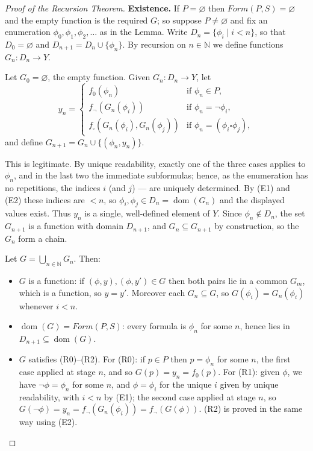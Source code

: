 \documentclass{article}
\theoremstyle{remark}\newtheorem{remark}{Remark}
\begin{document}
\begin{proof}[Proof of the Recursion Theorem]
\textbf{Existence.} If $P = \varnothing$ then $Form(P, S) = \varnothing$ and the empty function is the required $G$; so suppose $P \neq \varnothing$ and fix an enumeration $\phi_0, \phi_1, \phi_2, \dots$ as in the Lemma. Write $D_n = \{\phi_i \mid i < n\}$, so that $D_0 = \varnothing$ and $D_{n+1} = D_n \cup \{\phi_n\}$. By recursion on $n \in \mathbb{N}$ we define functions $G_n \colon D_n \to Y$.

Let $G_0 = \varnothing$, the empty function. Given $G_n \colon D_n \to Y$, let
\[
y_n =
\begin{cases}
    f_0(\phi_n) & \text{if } \phi_n \in P,\\
    f_{\neg}(G_n(\phi_i)) & \text{if } \phi_n = \neg\phi_i,\\
    f_{\square}(G_n(\phi_i), G_n(\phi_j)) & \text{if } \phi_n = (\phi_i \square \phi_j),
\end{cases}
\]
and define $G_{n+1} = G_n \cup \{(\phi_n, y_n)\}$.

This is legitimate. By unique readability, exactly one of the three cases applies to $\phi_n$, and in the last two the immediate subformulas; hence, as the enumeration has no repetitions, the indices $i$ (and $j$) --- are uniquely determined. By (E1) and (E2) these indices are $< n$, so $\phi_i, \phi_j \in D_n = \operatorname{dom}(G_n)$ and the displayed values exist. Thus $y_n$ is a single, well-defined element of $Y$. Since $\phi_n \notin D_n$, the set $G_{n+1}$ is a function with domain $D_{n+1}$, and $G_n \subseteq G_{n+1}$ by construction, so the $G_n$ form a chain.

Let $G = \bigcup_{n \in \mathbb{N}} G_n$. Then:
\begin{itemize}
    \item $G$ is a function: if $(\phi, y), (\phi, y') \in G$ then both pairs lie in a common $G_m$, which is a function, so $y = y'$. Moreover each $G_n \subseteq G$, so $G(\phi_i) = G_n(\phi_i)$ whenever $i < n$. \item $\operatorname{dom}(G) = Form(P, S)$: every formula is $\phi_n$ for some $n$, hence lies in $D_{n+1} \subseteq \operatorname{dom}(G)$. 
    \item $G$ satisfies (R0)--(R2). For (R0): if $p \in P$ then $p = \phi_n$ for some $n$, the first case applied at stage $n$, and so $G(p) = y_n = f_0(p)$. For (R1): given $\phi$, we have $\neg\phi = \phi_n$ for some $n$, and $\phi = \phi_i$ for the unique $i$ given by unique readability, with $i < n$ by (E1); the second case applied at stage $n$, so $G(\neg\phi) = y_n = f_{\neg}(G_n(\phi_i)) = f_{\neg}(G(\phi))$. (R2) is proved in the same way using (E2).
\end{itemize}


\end{proof}
\end{document}
